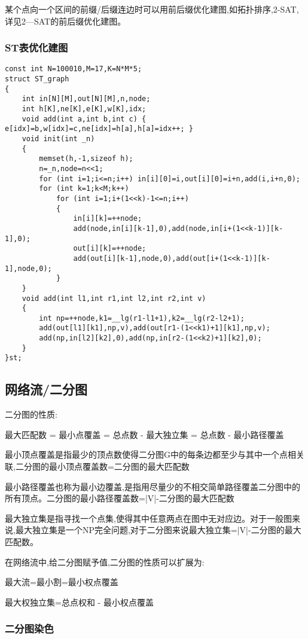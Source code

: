 \documentclass[a4paper]{ctexart}
\begin{document}
某个点向一个区间的前缀/后缀连边时可以用前后缀优化建图,如拓扑排序,2-SAT,详见2—SAT的前后缀优化建图。

\subsubsection{ST表优化建图}

\begin{lstlisting}
const int N=100010,M=17,K=N*M*5;
struct ST_graph
{   
    int in[N][M],out[N][M],n,node;
    int h[K],ne[K],e[K],w[K],idx;
    void add(int a,int b,int c) { e[idx]=b,w[idx]=c,ne[idx]=h[a],h[a]=idx++; }
    void init(int _n)
    {
        memset(h,-1,sizeof h);
        n=_n,node=n<<1;
        for (int i=1;i<=n;i++) in[i][0]=i,out[i][0]=i+n,add(i,i+n,0);
        for (int k=1;k<M;k++)
            for (int i=1;i+(1<<k)-1<=n;i++)
            {
                in[i][k]=++node;
                add(node,in[i][k-1],0),add(node,in[i+(1<<k-1)][k-1],0);
                out[i][k]=++node;
                add(out[i][k-1],node,0),add(out[i+(1<<k-1)][k-1],node,0);
            }
    }
    void add(int l1,int r1,int l2,int r2,int v)
    {
        int np=++node,k1=__lg(r1-l1+1),k2=__lg(r2-l2+1);
        add(out[l1][k1],np,v),add(out[r1-(1<<k1)+1][k1],np,v);
        add(np,in[l2][k2],0),add(np,in[r2-(1<<k2)+1][k2],0);
    }
}st;
\end{lstlisting}


\subsection{网络流/二分图}

二分图的性质:

最大匹配数 = 最小点覆盖 = 总点数 - 最大独立集 = 总点数 - 最小路径覆盖

最小顶点覆盖是指最少的顶点数使得二分图G中的每条边都至少与其中一个点相关联,二分图的最小顶点覆盖数=二分图的最大匹配数

最小路径覆盖也称为最小边覆盖,是指用尽量少的不相交简单路径覆盖二分图中的所有顶点。二分图的最小路径覆盖数=|V|-二分图的最大匹配数

最大独立集是指寻找一个点集,使得其中任意两点在图中无对应边。对于一般图来说,最大独立集是一个NP完全问题,对于二分图来说最大独立集=|V|-二分图的最大匹配数。

在网络流中,给二分图赋予值,二分图的性质可以扩展为:

最大流=最小割=最小权点覆盖

最大权独立集=总点权和 - 最小权点覆盖

\subsubsection{二分图染色}
\end{document}
